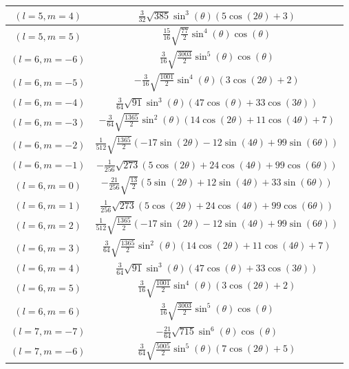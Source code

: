 \begin{center}
\begin{longtable}{|c|c|}
$(l=5, m=4)$ & $\frac{3}{32} \sqrt{385} \sin ^3(\theta ) (5 \cos (2 \theta )+3)$ \\ \hline
\rowcolor{gray!15}
$(l=5, m=5)$ & $\frac{15}{16} \sqrt{\frac{77}{2}} \sin ^4(\theta ) \cos (\theta )$ \\ \hline
$(l=6, m=-6)$ & $\frac{3}{16} \sqrt{\frac{3003}{2}} \sin ^5(\theta ) \cos (\theta )$ \\ \hline
\rowcolor{gray!15}
$(l=6, m=-5)$ & $-\frac{3}{16} \sqrt{\frac{1001}{2}} \sin ^4(\theta ) (3 \cos (2 \theta )+2)$ \\ \hline
$(l=6, m=-4)$ & $\frac{3}{64} \sqrt{91} \sin ^3(\theta ) (47 \cos (\theta )+33 \cos (3 \theta ))$ \\ \hline
\rowcolor{gray!15}
$(l=6, m=-3)$ & $-\frac{3}{64} \sqrt{\frac{1365}{2}} \sin ^2(\theta ) (14 \cos (2 \theta )+11 \cos (4 \theta )+7)$ \\ \hline
$(l=6, m=-2)$ & $\frac{1}{512} \sqrt{\frac{1365}{2}} (-17 \sin (2 \theta )-12 \sin (4 \theta )+99 \sin (6 \theta ))$ \\ \hline
\rowcolor{gray!15}
$(l=6, m=-1)$ & $-\frac{1}{256} \sqrt{273} (5 \cos (2 \theta )+24 \cos (4 \theta )+99 \cos (6 \theta ))$ \\ \hline
$(l=6, m=0)$ & $-\frac{21}{256} \sqrt{\frac{13}{2}} (5 \sin (2 \theta )+12 \sin (4 \theta )+33 \sin (6 \theta ))$ \\ \hline
\rowcolor{gray!15}
$(l=6, m=1)$ & $\frac{1}{256} \sqrt{273} (5 \cos (2 \theta )+24 \cos (4 \theta )+99 \cos (6 \theta ))$ \\ \hline
$(l=6, m=2)$ & $\frac{1}{512} \sqrt{\frac{1365}{2}} (-17 \sin (2 \theta )-12 \sin (4 \theta )+99 \sin (6 \theta ))$ \\ \hline
\rowcolor{gray!15}
$(l=6, m=3)$ & $\frac{3}{64} \sqrt{\frac{1365}{2}} \sin ^2(\theta ) (14 \cos (2 \theta )+11 \cos (4 \theta )+7)$ \\ \hline
$(l=6, m=4)$ & $\frac{3}{64} \sqrt{91} \sin ^3(\theta ) (47 \cos (\theta )+33 \cos (3 \theta ))$ \\ \hline
\rowcolor{gray!15}
$(l=6, m=5)$ & $\frac{3}{16} \sqrt{\frac{1001}{2}} \sin ^4(\theta ) (3 \cos (2 \theta )+2)$ \\ \hline
$(l=6, m=6)$ & $\frac{3}{16} \sqrt{\frac{3003}{2}} \sin ^5(\theta ) \cos (\theta )$ \\ \hline
\rowcolor{gray!15}
$(l=7, m=-7)$ & $-\frac{21}{64} \sqrt{715} \sin ^6(\theta ) \cos (\theta )$ \\ \hline
$(l=7, m=-6)$ & $\frac{3}{64} \sqrt{\frac{5005}{2}} \sin ^5(\theta ) (7 \cos (2 \theta )+5)$ \\ \hline

\end{longtable}
\end{center}

